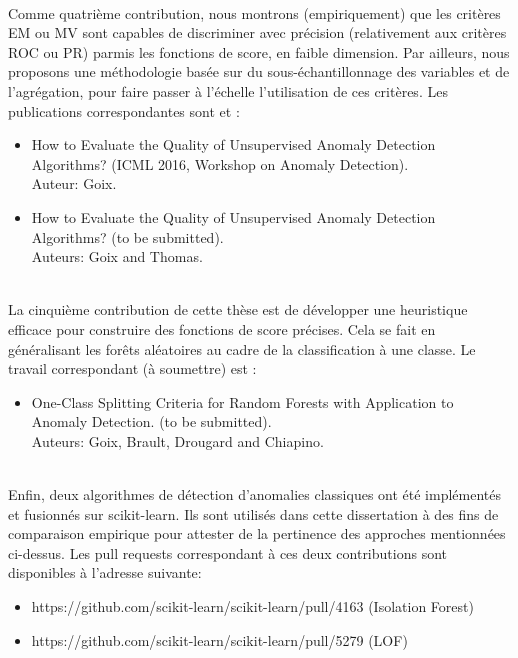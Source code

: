 ~\\
Comme quatrième contribution, nous montrons (empiriquement) que les critères EM ou MV sont capables de discriminer avec précision (relativement aux critères ROC ou PR) parmis les fonctions de score, en faible dimension. Par ailleurs, nous proposons une méthodologie basée sur du sous-échantillonnage des variables et de l'agrégation,  pour faire passer à l'échelle l'utilisation de ces critères.
Les publications correspondantes sont \cite{ICMLworkshop16} et \cite{NIPS16evaluation}:
\begin{itemize}
\item How to Evaluate the Quality of Unsupervised Anomaly Detection Algorithms? (ICML 2016, Workshop on Anomaly Detection). %
  \\
Auteur: Goix. 
\item How to Evaluate the Quality of Unsupervised Anomaly Detection Algorithms? (to be submitted).\\ Auteurs: Goix and Thomas. 
\end{itemize}

~\\
La cinquième contribution de cette thèse est de développer une heuristique efficace pour construire des fonctions de score précises. Cela se fait en généralisant les forêts aléatoires au cadre de la classification à une classe. Le travail correspondant (à soumettre) est \cite{OCRF16}:
%
\begin{itemize}
\item One-Class Splitting Criteria for Random Forests with Application to Anomaly Detection. (to be submitted).\\
Auteurs: Goix, Brault, Drougard and Chiapino.
\end{itemize}

~\\
Enfin, deux algorithmes de détection d'anomalies classiques ont été implémentés et fusionnés sur scikit-learn. Ils sont utilisés dans cette dissertation à des fins de comparaison empirique pour attester de la pertinence des approches mentionnées ci-dessus.
Les pull requests correspondant à ces deux contributions sont disponibles à l'adresse suivante:
%
\begin{itemize}
\item https://github.com/scikit-learn/scikit-learn/pull/4163  (Isolation Forest)
\item https://github.com/scikit-learn/scikit-learn/pull/5279 (LOF)
\end{itemize}


